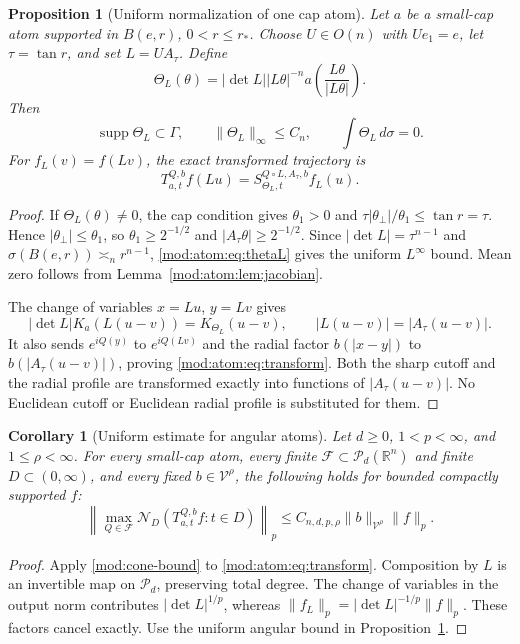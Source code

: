 \documentclass[11pt]{article}
\numberwithin{equation}{section}
\newtheorem{proposition}[theorem]{Proposition}
\newtheorem{corollary}[theorem]{Corollary}
\theoremstyle{remark}
\theoremstyle{definition}
\newcommand{\R}{\mathbb R}
\newcommand{\supp}{\operatorname{supp}}
\newcommand{\norm}[1]{\lVert #1\rVert}
\newcommand{\NN}{\mathcal N}
\newcommand{\PP}{\mathcal P}
\begin{document}
\begin{proposition}[Uniform normalization of one cap atom]\label{mod:atom:prop:cap}
Let $a$ be a small-cap atom supported in $B(e,r)$, $0<r\le r_*$. Choose
$U\in O(n)$ with $Ue_1=e$, let $\tau=\tan r$, and set $L=UA_\tau$.
Define
\begin{equation}\label{mod:atom:eq:thetaL}
 \Theta_L(\theta)=|\det L||L\theta|^{-n}
 a\left(\frac{L\theta}{|L\theta|}\right).
\end{equation}
Then
\[
 \supp\Theta_L\subset\Gamma,\qquad
 \norm{\Theta_L}_\infty\le C_n,\qquad
 \int\Theta_L\,d\sigma=0.
\]
For $f_L(v)=f(Lv)$, the exact transformed trajectory is
\begin{equation}\label{mod:atom:eq:transform}
 T_{a,t}^{Q,b}f(Lu)
 =S_{\Theta_L,t}^{Q\circ L,A_\tau,b}f_L(u).
\end{equation}
\end{proposition}
\begin{proof}
If $\Theta_L(\theta)\ne0$, the cap condition gives
$\theta_1>0$ and
$\tau|\theta_\perp|/\theta_1\le\tan r=\tau$.
Hence $|\theta_\perp|\le\theta_1$, so $\theta_1\ge2^{-1/2}$ and
$|A_\tau\theta|\ge2^{-1/2}$. Since
$|\det L|=\tau^{n-1}$ and $\sigma(B(e,r))\asymp_nr^{n-1}$,
\eqref{mod:atom:eq:thetaL} gives the uniform $L^\infty$ bound. Mean zero follows
from Lemma~\ref{mod:atom:lem:jacobian}.

The change of variables $x=Lu$, $y=Lv$ gives
\[
 |\det L|K_a(L(u-v))=K_{\Theta_L}(u-v),\qquad
 |L(u-v)|=|A_\tau(u-v)|.
\]
It also sends $e^{iQ(y)}$ to $e^{iQ(Lv)}$ and the radial factor
$b(|x-y|)$ to $b(|A_\tau(u-v)|)$, proving
\eqref{mod:atom:eq:transform}. Both the sharp cutoff and the radial profile are transformed
exactly into functions of $|A_\tau(u-v)|$. No Euclidean cutoff
or Euclidean radial profile is substituted for them.
\end{proof}

\begin{corollary}[Uniform estimate for angular atoms]
\label{mod:atom:cor:atomop}
Let $d\ge0$, $1<p<\infty$, and $1\le\rho<\infty$. For every
small-cap atom, every finite $\mathcal F\subset\PP_d(\R^n)$ and
finite $D\subset(0,\infty)$, and every fixed
$b\in\mathcal V^\rho$, the following holds for bounded compactly
supported $f$:
\[
 \left\|\max_{Q\in\mathcal F}\NN_D(T_{a,t}^{Q,b}f:t\in D)\right\|_p
 \le C_{n,d,p,\rho}\|b\|_{\mathcal V^\rho}\norm f_p.
\]
\end{corollary}
\begin{proof}
Apply \eqref{mod:cone-bound} to \eqref{mod:atom:eq:transform}. Composition by $L$ is
an invertible map on $\PP_d$, preserving total degree. The change of
variables in the output norm contributes $|\det L|^{1/p}$, whereas
$\norm{f_L}_p=|\det L|^{-1/p}\norm f_p$. These factors cancel exactly.
Use the uniform angular bound in Proposition~\ref{mod:atom:prop:cap}.
\end{proof}
\end{document}
